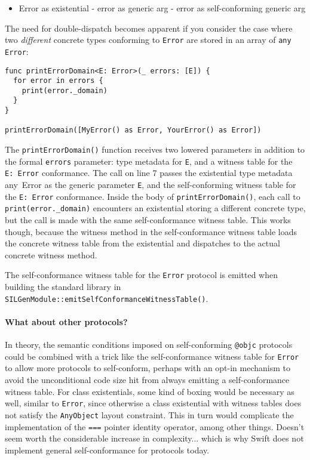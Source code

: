 \documentclass[../generics]{subfiles}
\begin{document}
\begin{itemize}
\item Error as existential - error as generic arg - error as self-conforming generic arg
\end{itemize}

The need for double-dispatch becomes apparent if you consider the case where two \emph{different} concrete types conforming to \texttt{Error} are stored in an array of \texttt{any Error}:
\begin{Verbatim}
func printErrorDomain<E: Error>(_ errors: [E]) {
  for error in errors {
    print(error._domain)
  }
}

printErrorDomain([MyError() as Error, YourError() as Error])
\end{Verbatim}
The \texttt{printErrorDomain()} function receives two lowered parameters in addition to the formal \texttt{errors} parameter: type metadata for \texttt{E}, and a witness table for the \texttt{E:~Error} conformance. The call on line 7 passes the existential type metadata {any~Error} as the generic parameter \texttt{E}, and the self-conforming witness table for the \texttt{E:~Error} conformance. Inside the body of \texttt{printErrorDomain()}, each call to \texttt{print(error.\_domain)} encounters an existential storing a different concrete type, but the call is made with the same self-conformance witness table. This works though, because the witness method in the self-conformance witness table loads the concrete witness table from the existential and dispatches to the actual concrete witness method.

The self-conformance witness table for the \texttt{Error} protocol is emitted when building the standard library in \texttt{SILGenModule::emitSelfConformanceWitnessTable()}.

\paragraph{What about other protocols?} In theory, the semantic conditions imposed on self-conforming \texttt{@objc} protocols could be combined with a trick like the self-conformance witness table for \texttt{Error} to allow more protocols to self-conform, perhaps with an opt-in mechanism to avoid the unconditional code size hit from always emitting a self-conformance witness table. For class existentials, some kind of boxing would be necessary as well, similar to \texttt{Error}, since otherwise a class existential with witness tables does not satisfy the \texttt{AnyObject} layout constraint. This in turn would complicate the implementation of the \texttt{===} pointer identity operator, among other things. Doesn't seem worth the considerable increase in complexity... which is why Swift does not implement general self-conformance for protocols today.
\end{document}
